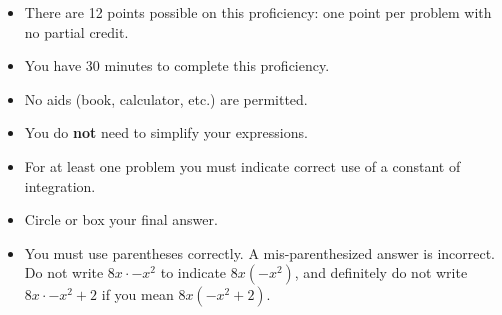 \documentclass[12pt]{article}
\begin{document}
\begin{itemize}
\item 
There are 12 points possible on this proficiency: one point per problem with
no partial credit. 

\item You have 30 minutes to complete this proficiency.

\item No aids (book, calculator, etc.) are permitted.  

\item You do \textbf{not} need to simplify your expressions.

\item For at least one problem you must indicate correct
use of a constant of integration.

\item Circle or box your final answer.

\item You must use parentheses correctly. A mis-parenthesized answer is incorrect. Do not write $8x \cdot -x^{2}$ to indicate $8x(-x^{2})$, and definitely do not write $8x\cdot -x^{2}+2$ if you mean $8x(-x^{2}+2)$.
\end{itemize}
\end{document}
